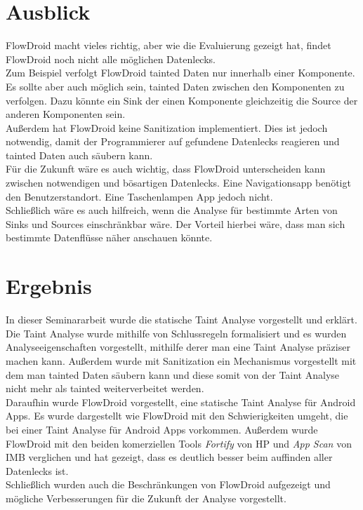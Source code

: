 \documentclass[runningheads]{llncs}
\begin{document}
\section{Ausblick} 
FlowDroid macht vieles richtig, aber wie die Evaluierung gezeigt hat, findet FlowDroid noch nicht alle möglichen Datenlecks.\\ 
Zum Beispiel verfolgt FlowDroid tainted Daten nur innerhalb einer Komponente. Es sollte aber auch möglich sein, tainted Daten zwischen den Komponenten zu verfolgen. Dazu könnte ein Sink der einen Komponente gleichzeitig die Source der anderen Komponenten sein.\\
Außerdem hat FlowDroid keine Sanitization implementiert. Dies ist jedoch notwendig, damit der Programmierer auf gefundene Datenlecks reagieren und tainted Daten auch säubern kann. \\
Für die Zukunft wäre es auch wichtig, dass FlowDroid unterscheiden kann zwischen notwendigen und bösartigen Datenlecks. Eine Navigationsapp benötigt den Benutzerstandort. Eine Taschenlampen App jedoch nicht.\\
Schließlich wäre es auch hilfreich, wenn die Analyse für bestimmte Arten von Sinks und Sources einschränkbar wäre. Der Vorteil hierbei wäre, dass man sich bestimmte Datenflüsse näher anschauen könnte.

\section{Ergebnis}
In dieser Seminararbeit wurde die statische Taint Analyse vorgestellt und erklärt. Die Taint Analyse wurde mithilfe von Schlussregeln formalisiert und es wurden Analyseeigenschaften vorgestellt, mithilfe derer man eine Taint Analyse präziser machen kann. Außerdem wurde mit Sanitization ein Mechanismus vorgestellt mit dem man tainted Daten säubern kann und diese somit von der Taint Analyse nicht mehr als tainted weiterverbeitet werden. \\
Daraufhin wurde FlowDroid vorgestellt, eine statische Taint Analyse für Android Apps. Es wurde dargestellt wie FlowDroid mit den Schwierigkeiten umgeht, die bei einer Taint Analyse für Android Apps vorkommen. Außerdem wurde FlowDroid mit den beiden komerziellen Tools \emph{Fortify} von HP und \emph{App Scan} von IMB verglichen und hat gezeigt, dass es deutlich besser beim auffinden aller Datenlecks ist.\\
Schließlich wurden auch die Beschränkungen von FlowDroid aufgezeigt und mögliche Verbesserungen für die Zukunft der Analyse vorgestellt.
%
 
\nocite{*}


\end{document}
